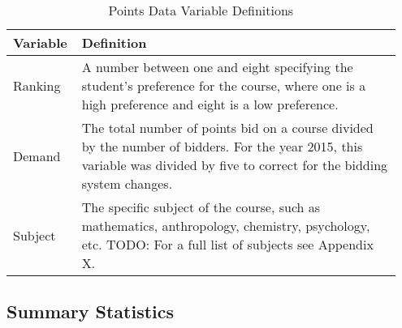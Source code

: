 \bigskip

\begin{table}[htb]
  \centering
  \caption{Points Data Variable Definitions}\label{tab:def2}
  \begin{tabular}{p{0.15\linewidth}|p{0.8\linewidth}} 
    \hline\hline
    Variable & Definition \\ [0.5ex] 
    \hline\hline
    Ranking & A number between one and eight specifying the student's preference for the course, where one is a high preference and eight is a low preference. \\ 
    \hline
    Demand & The total number of points bid on a course divided by the number of bidders. For the year 2015, this variable was divided by five to correct for the bidding system changes.\\
    \hline
    Subject & The specific subject of the course, such as mathematics, anthropology, chemistry, psychology, etc. TODO: For a full list of subjects see Appendix X. \\
    [1ex] 
    \hline\hline
  \end{tabular}
\end{table}

\subsection{Summary Statistics}\label{summarystats}


